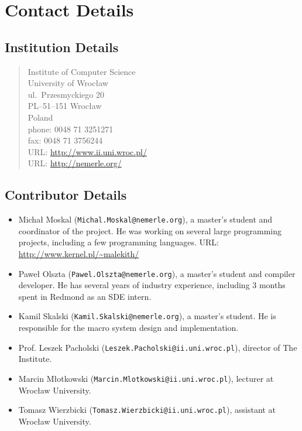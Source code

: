 \documentclass[a4paper,11pt]{article}
\begin{document}
\section{Contact Details}


\subsection{Institution Details}

\begin{quote}
Institute of Computer Science\\
University of Wroc\l aw\\
ul.\ Przesmyckiego 20\\
PL--51--151 Wroc\l aw\\
Poland\\[2ex]
phone: 0048 71 3251271\\
fax:   0048 71 3756244\\
URL: \url{http://www.ii.uni.wroc.pl/}\\
URL: \url{http://nemerle.org/}
\end{quote}


\subsection{Contributor Details}
\begin{itemize}

\item
Micha{\l} Moskal (\texttt{Michal.Moskal@nemerle.org}), a master's
student and coordinator of the project. He was working on several large
programming projects, including a few programming languages. URL: 
\url{http://www.kernel.pl/~malekith/}

\item
Pawe{\l} Olszta (\texttt{Pawel.Olszta@nemerle.org}), a master's student
and compiler developer. He has several years of industry experience, 
including 3 months spent in Redmond as an SDE intern. 

\item
Kamil Skalski (\texttt{Kamil.Skalski@nemerle.org}), a master's student.
He is responsible for the macro system design and implementation.

\item
Prof. Leszek Pacholski (\texttt{Leszek.Pacholski@ii.uni.wroc.pl}), 
director of The Institute.

\item
Marcin M\l otkowski (\texttt{Marcin.Mlotkowski@ii.uni.wroc.pl}), 
lecturer at Wroc\l aw University.

\item
Tomasz Wierzbicki (\texttt{Tomasz.Wierzbicki@ii.uni.wroc.pl}), 
assistant at Wroc\l aw University.

\end{itemize}
\end{document}
